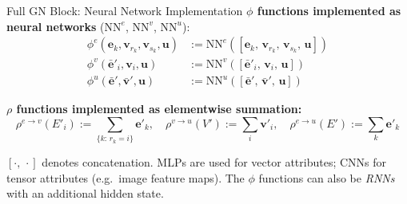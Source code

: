 \documentclass[10pt]{beamer}
\begin{document}
\begin{frame}{Full GN Block: Neural Network Implementation}
\textbf{$\phi$ functions implemented as neural networks} ($\mathrm{NN}^e$, $\mathrm{NN}^v$, $\mathrm{NN}^u$):
\begin{align*}
    \phi^e(\mathbf{e}_k, \mathbf{v}_{r_k}, \mathbf{v}_{s_k}, \mathbf{u})
        &:= \mathrm{NN}^e\!\left([\mathbf{e}_k,\, \mathbf{v}_{r_k},\, \mathbf{v}_{s_k},\, \mathbf{u}]\right) \\[2pt]
    \phi^v(\bar{\mathbf{e}}'_i, \mathbf{v}_i, \mathbf{u})
        &:= \mathrm{NN}^v\!\left([\bar{\mathbf{e}}'_i,\, \mathbf{v}_i,\, \mathbf{u}]\right) \\[2pt]
    \phi^u(\bar{\mathbf{e}}', \bar{\mathbf{v}}', \mathbf{u})
        &:= \mathrm{NN}^u\!\left([\bar{\mathbf{e}}',\, \bar{\mathbf{v}}',\, \mathbf{u}]\right)
\end{align*}

\textbf{$\rho$ functions implemented as elementwise summation:}
\begin{equation*}
    \rho^{e \to v}(E'_i) := \!\!\sum_{\{k:\, r_k = i\}}\!\! \mathbf{e}'_k, \quad
    \rho^{v \to u}(V') := \sum_i \mathbf{v}'_i, \quad
    \rho^{e \to u}(E') := \sum_k \mathbf{e}'_k
\end{equation*}

\vspace{0.2cm}
$[\cdot,\, \cdot]$ denotes concatenation. MLPs are used for vector attributes;
CNNs for tensor attributes (e.g.\ image feature maps). The $\phi$ functions
can also be \emph{RNNs} with an additional hidden state.
\end{frame}
\end{document}
